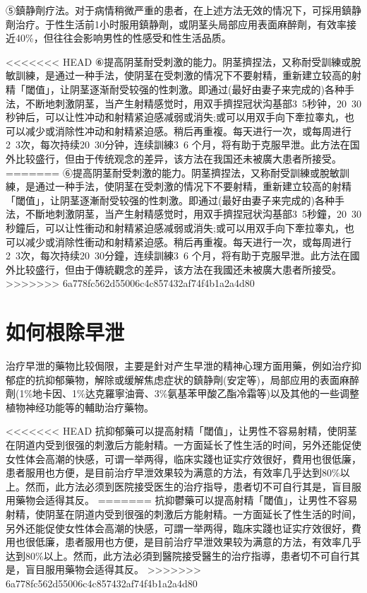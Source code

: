 \documentclass[12pt,UTF8]{ctexbook}
\begin{document}
⑤鎮静劑疗法。对于病情稍微严重的患者，在上述方法无效的情况下，可採用鎮静劑治疗。于性生活前1小时服用鎮静劑，或阴茎头局部应用表面麻醉劑，有效率接近40\%，但往往会影响男性的性感受和性生活品质。

<<<<<<< HEAD
⑥提高阴茎耐受刺激的能力。阴茎擠捏法，又称耐受訓練或脫敏訓練，是通过一种手法，使阴茎在受刺激的情况下不要射精，重新建立较高的射精「閾值」，让阴茎逐渐耐受较强的性刺激。即通过(最好由妻子来完成的)各种手法，不断地刺激阴茎，当产生射精感觉时，用双手擠捏冠状沟基部3~5秒钟，20~30秒钟后，可以让性冲动和射精紧迫感减弱或消失;或可以用双手向下牽拉睾丸，也可以减少或消除性冲动和射精紧迫感。稍后再重複。每天进行一次，或每周进行2~3次，每次持续20~30分钟，连续訓練3~6 个月，将有助于克服早泄。此方法在国外比较盛行，但由于传统观念的差异，该方法在我国还未被廣大患者所接受。
=======
⑥提高阴茎耐受刺激的能力。阴茎擠捏法，又称耐受訓練或脫敏訓練，是通过一种手法，使阴茎在受刺激的情况下不要射精，重新建立较高的射精「閾值」，让阴茎逐漸耐受较强的性刺激。即通过(最好由妻子来完成的)各种手法，不斷地刺激阴茎，当产生射精感觉时，用双手擠捏冠状沟基部3~5秒鐘，20~30秒鐘后，可以让性衝动和射精紧迫感减弱或消失;或可以用双手向下牽拉睾丸，也可以减少或消除性衝动和射精紧迫感。稍后再重複。每天进行一次，或每周进行2~3次，每次持续20~30分鐘，连续訓練3~6 个月，将有助于克服早泄。此方法在國外比较盛行，但由于傳統觀念的差异，该方法在我國还未被廣大患者所接受。
>>>>>>> 6a778fc562d55006c4c857432af74f4b1a2a4d80

\section{如何根除早泄}

治疗早泄的藥物比较侷限，主要是針对产生早泄的精神心理方面用藥，例如治疗抑郁症的抗抑郁藥物，解除或缓解焦虑症状的鎮静劑(安定等)，局部应用的表面麻醉劑(1\%地卡因、1\%达克羅寧油膏、3\%氨基苯甲酸乙酯冷霜等)以及其他的一些调整植物神经功能等的輔助治疗藥物。

<<<<<<< HEAD
抗抑郁藥可以提高射精「閾值」，让男性不容易射精，使阴茎在阴道内受到很强的刺激后方能射精。一方面延长了性生活的时间，另外还能促使女性体会高潮的快感，可谓一举两得，临床实踐也证实疗效很好，費用也很低廉，患者服用也方便，是目前治疗早泄效果较为满意的方法，有效率几乎达到80\%以上。然而，此方法必须到医院接受医生的治疗指导，患者切不可自行其是，盲目服用藥物会适得其反。
=======
抗抑鬱藥可以提高射精「閾值」，让男性不容易射精，使阴茎在阴道内受到很强的刺激后方能射精。一方面延长了性生活的时间，另外还能促使女性体会高潮的快感，可謂一举两得，臨床实踐也证实疗效很好，費用也很低廉，患者服用也方便，是目前治疗早泄效果较为满意的方法，有效率几乎达到80\%以上。然而，此方法必須到醫院接受醫生的治疗指導，患者切不可自行其是，盲目服用藥物会适得其反。
>>>>>>> 6a778fc562d55006c4c857432af74f4b1a2a4d80
\end{document}
